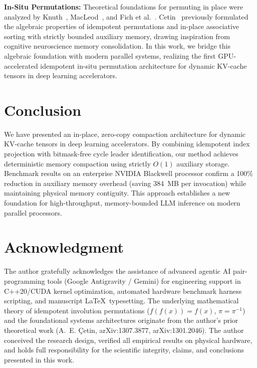 \documentclass[journal,10pt,twocolumn]{article}
\begin{document}
\textbf{In-Situ Permutations:} Theoretical foundations for permuting in place were analyzed by Knuth~\cite{knuth1998art}, MacLeod~\cite{macleod1970inversion}, and Fich et al.~\cite{fich1995permuting}. Cetin~\cite{cetin2013idempotent, cetin2013insitu, cetin2013inplace, cetin2012improved} previously formulated the algebraic properties of idempotent permutations and in-place associative sorting with strictly bounded auxiliary memory, drawing inspiration from cognitive neuroscience memory consolidation. In this work, we bridge this algebraic foundation with modern parallel systems, realizing the first GPU-accelerated idempotent in-situ permutation architecture for dynamic KV-cache tensors in deep learning accelerators.

\section{Conclusion}
\label{sec:conclusion}
We have presented an in-place, zero-copy compaction architecture for dynamic KV-cache tensors in deep learning accelerators. By combining idempotent index projection with bitmask-free cycle leader identification, our method achieves deterministic memory compaction using strictly $O(1)$ auxiliary storage. Benchmark results on an enterprise NVIDIA Blackwell processor confirm a 100\% reduction in auxiliary memory overhead (saving 384~MB per invocation) while maintaining physical memory contiguity. This approach establishes a new foundation for high-throughput, memory-bounded LLM inference on modern parallel processors.

\section*{Acknowledgment}
The author gratefully acknowledges the assistance of advanced agentic AI pair-programming tools (Google Antigravity / Gemini) for engineering support in C++20/CUDA kernel optimization, automated hardware benchmark harness scripting, and manuscript \LaTeX\ typesetting. The underlying mathematical theory of idempotent involution permutations ($f(f(x))=f(x)$, $\pi = \pi^{-1}$) and the foundational systems architectures originate from the author's prior theoretical work (A.~E. {\c{C}}etin, arXiv:1307.3877, arXiv:1301.2046). The author conceived the research design, verified all empirical results on physical hardware, and holds full responsibility for the scientific integrity, claims, and conclusions presented in this work.



\end{document}
